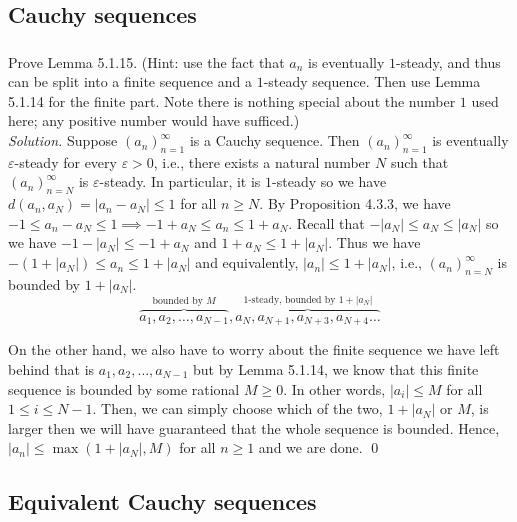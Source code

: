 \documentclass{amsart}
\theoremstyle{definition}
\newcommand{\soln}{\newline\textit{Solution.} }
\begin{document}
\subsection{Cauchy sequences}

\subsubsection{} Prove Lemma 5.1.15. (Hint: use the fact that $a_n$ is eventually $1$-steady, and thus can be split into a finite sequence and a $1$-steady sequence. Then use Lemma 5.1.14 for the finite part. Note there is nothing special about the number $1$ used here; any positive number would have sufficed.) \\
\soln Suppose $(a_n)_{n=1}^\infty$ is a Cauchy sequence. Then $(a_n)_{n=1}^\infty$ is eventually $\varepsilon$-steady for every $\varepsilon>0$, i.e., there exists a natural number $N$ such that $(a_n)_{n=N}^\infty$ is $\varepsilon$-steady. In particular, it is $1$-steady so we have $d(a_n,a_N)=|a_n-a_N|\leq 1$ for all $n\geq N$. By Proposition 4.3.3, we have $-1\leq a_n-a_N\leq 1\implies -1+a_N\leq a_n\leq 1+a_N$. Recall that $-|a_N|\leq a_N\leq |a_N|$ so we have $-1-|a_N|\leq -1+a_N$ and $1+a_N\leq 1+|a_N|$. Thus we have $-(1+|a_N|)\leq a_n\leq 1+|a_N|$ and equivalently, $|a_n|\leq 1+|a_N|$, i.e., $(a_n)_{n=N}^\infty$ is bounded by $1+|a_N|$. 
\[
\overbrace{a_1,a_2,\dots,a_{N-1}}^{\text{bounded by } M}, \overbrace{a_N,a_{N+1},a_{N+3},a_{N+4}\dots}^{\text{1-steady, bounded by } 1+|a_N|}
\]

On the other hand, we also have to worry about the finite sequence we have left behind that is $a_1,a_2,\dots, a_{N-1}$ but by Lemma 5.1.14, we know that this finite sequence is bounded by some rational $M\geq 0$. In other words, $|a_i|\leq M$ for all $1\leq i\leq N-1$. Then, we can simply choose which of the two, $1+|a_N|$ or $M$, is larger then we will have guaranteed that the whole sequence is bounded. Hence, $|a_n|\leq\max(1+|a_N|,M)$ for all $n\geq 1$ and we are done. \qed \\

\subsection{Equivalent Cauchy sequences} 
\end{document}
